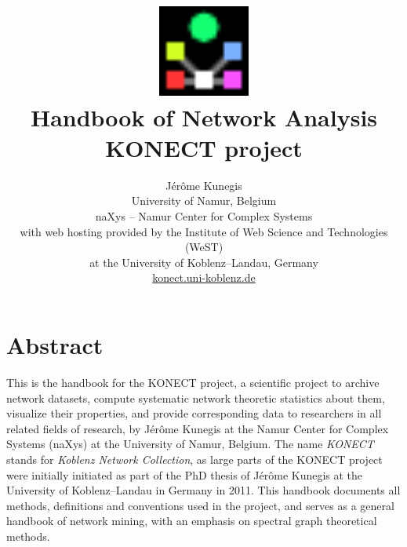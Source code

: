\documentclass{article}
\begin{document}
\title{
  \includegraphics[width=3cm]{konect-logo} \\
  \vspace{1cm}
  {\Huge Handbook of Network Analysis} \\
  KONECT project
}

\author{
  Jérôme Kunegis \\
  University of Namur, Belgium \\
  naXys -- Namur Center for Complex Systems \\
  {\small with web hosting provided by the Institute of Web Science and
    Technologies (WeST)} \\ 
  {\small at the University of Koblenz--Landau, Germany} \\
  {\small \href{http://konect.uni-koblenz.de/}{konect.uni-koblenz.de}}
}

\maketitle

\section*{Abstract}
This is the handbook for the KONECT project, a scientific project to
archive network datasets, compute systematic network theoretic
statistics about them, visualize their properties, and provide
corresponding data to researchers in all related fields of research, by
Jérôme Kunegis at the Namur Center for Complex Systems (naXys) at the
University of Namur, Belgium.  The name \emph{KONECT} stands for
\emph{Koblenz Network Collection}, as large parts of the KONECT
project were initially initiated as part of the PhD thesis of Jérôme
Kunegis at the University of Koblenz--Landau in Germany in 2011.  This
handbook documents all methods, definitions and conventions used in the
project, and serves as a general handbook of network mining, with an
emphasis on spectral graph theoretical methods.

\thispagestyle{empty}
\newpage
\end{document}
